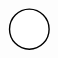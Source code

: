 \documentclass[10pt]{article}
\theoremstyle{plain}
\theoremstyle{remark}
\begin{document}
\[\begin{pgfpicture}
\begin{pgfscope}
\pgfpathcurveto{\pgfqpoint{3.762201in}{3.060048in}}{\pgfqpoint{3.741505in}{3.110012in}}{\pgfqpoint{3.704671in}{3.146846in}}%
\pgfpathcurveto{\pgfqpoint{3.667838in}{3.183680in}}{\pgfqpoint{3.617873in}{3.204376in}}{\pgfqpoint{3.565783in}{3.204376in}}%
\pgfpathcurveto{\pgfqpoint{3.513692in}{3.204376in}}{\pgfqpoint{3.463727in}{3.183680in}}{\pgfqpoint{3.426894in}{3.146846in}}%
\pgfpathcurveto{\pgfqpoint{3.390060in}{3.110012in}}{\pgfqpoint{3.369364in}{3.060048in}}{\pgfqpoint{3.369364in}{3.007957in}}%
\pgfpathcurveto{\pgfqpoint{3.369364in}{2.955866in}}{\pgfqpoint{3.390060in}{2.905902in}}{\pgfqpoint{3.426894in}{2.869068in}}%
\pgfpathcurveto{\pgfqpoint{3.463727in}{2.832234in}}{\pgfqpoint{3.513692in}{2.811538in}}{\pgfqpoint{3.565783in}{2.811538in}}%
\pgfpathclose%
\pgfusepath{stroke,fill}%
\end{pgfscope}%
\begin{pgfscope}%
\pgfsetbuttcap%
\pgfsetroundjoin%
\definecolor{currentfill}{rgb}{1.000000,1.000000,1.000000}%
\pgfsetfillcolor{currentfill}%
\pgfsetlinewidth{1.003750pt}%
\definecolor{currentstroke}{rgb}{0.000000,0.000000,0.000000}%
\pgfsetstrokecolor{currentstroke}%
\pgfsetdash{}{0pt}%
\pgfpathmoveto{\pgfqpoint{0.296419in}{2.811538in}}%
\pgfpathcurveto{\pgfqpoint{0.348509in}{2.811538in}}{\pgfqpoint{0.398474in}{2.832234in}}{\pgfqpoint{0.435307in}{2.869068in}}%
\pgfpathcurveto{\pgfqpoint{0.472141in}{2.905902in}}{\pgfqpoint{0.492837in}{2.955866in}}{\pgfqpoint{0.492837in}{3.007957in}}%
\pgfpathcurveto{\pgfqpoint{0.492837in}{3.060048in}}{\pgfqpoint{0.472141in}{3.110012in}}{\pgfqpoint{0.435307in}{3.146846in}}%
\pgfpathcurveto{\pgfqpoint{0.398474in}{3.183680in}}{\pgfqpoint{0.348509in}{3.204376in}}{\pgfqpoint{0.296419in}{3.204376in}}%
\pgfpathcurveto{\pgfqpoint{0.244328in}{3.204376in}}{\pgfqpoint{0.194363in}{3.183680in}}{\pgfqpoint{0.157530in}{3.146846in}}%
\pgfpathcurveto{\pgfqpoint{0.120696in}{3.110012in}}{\pgfqpoint{0.100000in}{3.060048in}}{\pgfqpoint{0.100000in}{3.007957in}}%
\pgfpathcurveto{\pgfqpoint{0.100000in}{2.955866in}}{\pgfqpoint{0.120696in}{2.905902in}}{\pgfqpoint{0.157530in}{2.869068in}}%
\pgfpathcurveto{\pgfqpoint{0.194363in}{2.832234in}}{\pgfqpoint{0.244328in}{2.811538in}}{\pgfqpoint{0.296419in}{2.811538in}}%
\pgfpathclose%
\pgfusepath{stroke,fill}%
\end{pgfscope}%
\begin{pgfscope}%
\pgfsetbuttcap%
\pgfsetroundjoin%
\definecolor{currentfill}{rgb}{1.000000,1.000000,1.000000}%
\pgfsetfillcolor{currentfill}%
\pgfsetlinewidth{1.003750pt}%
\definecolor{currentstroke}{rgb}{0.000000,0.000000,0.000000}%

\end{pgfscope}
\end{pgfpicture}\]
\end{document}
